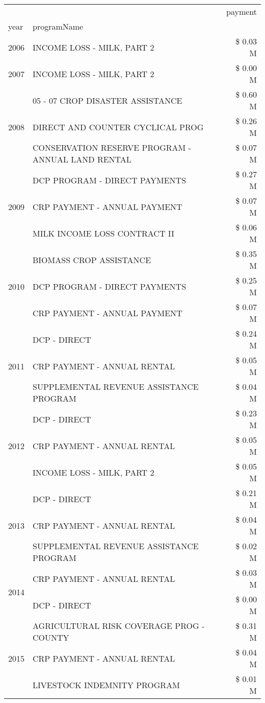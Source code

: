 \begin{tabular}{llr}
\toprule
 &  & payment \\
year & programName &  \\
\midrule
2006 & INCOME LOSS - MILK, PART 2 & \$ 0.03 M \\
\cline{1-3}
2007 & INCOME LOSS - MILK, PART 2 & \$ 0.00 M \\
\cline{1-3}
\multirow[t]{3}{*}{2008} & 05 - 07 CROP DISASTER ASSISTANCE & \$ 0.60 M \\
 & DIRECT AND COUNTER CYCLICAL PROG & \$ 0.26 M \\
 & CONSERVATION RESERVE PROGRAM - ANNUAL LAND RENTAL & \$ 0.07 M \\
\cline{1-3}
\multirow[t]{3}{*}{2009} & DCP PROGRAM - DIRECT PAYMENTS & \$ 0.27 M \\
 & CRP PAYMENT - ANNUAL PAYMENT & \$ 0.07 M \\
 & MILK INCOME LOSS CONTRACT II & \$ 0.06 M \\
\cline{1-3}
\multirow[t]{3}{*}{2010} & BIOMASS CROP ASSISTANCE & \$ 0.35 M \\
 & DCP PROGRAM - DIRECT PAYMENTS & \$ 0.25 M \\
 & CRP PAYMENT - ANNUAL PAYMENT & \$ 0.07 M \\
\cline{1-3}
\multirow[t]{3}{*}{2011} & DCP - DIRECT & \$ 0.24 M \\
 & CRP PAYMENT - ANNUAL RENTAL & \$ 0.05 M \\
 & SUPPLEMENTAL REVENUE ASSISTANCE PROGRAM & \$ 0.04 M \\
\cline{1-3}
\multirow[t]{3}{*}{2012} & DCP - DIRECT & \$ 0.23 M \\
 & CRP PAYMENT - ANNUAL RENTAL & \$ 0.05 M \\
 & INCOME LOSS - MILK, PART 2 & \$ 0.05 M \\
\cline{1-3}
\multirow[t]{3}{*}{2013} & DCP - DIRECT & \$ 0.21 M \\
 & CRP PAYMENT - ANNUAL RENTAL & \$ 0.04 M \\
 & SUPPLEMENTAL REVENUE ASSISTANCE PROGRAM & \$ 0.02 M \\
\cline{1-3}
\multirow[t]{2}{*}{2014} & CRP PAYMENT - ANNUAL RENTAL & \$ 0.03 M \\
 & DCP - DIRECT & \$ 0.00 M \\
\cline{1-3}
\multirow[t]{3}{*}{2015} & AGRICULTURAL RISK COVERAGE PROG - COUNTY & \$ 0.31 M \\
 & CRP PAYMENT - ANNUAL RENTAL & \$ 0.04 M \\
 & LIVESTOCK INDEMNITY PROGRAM & \$ 0.01 M \\

\end{tabular}

